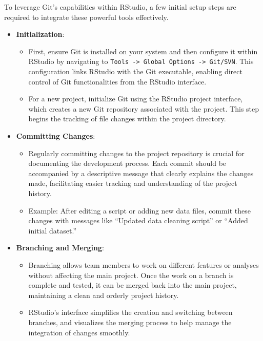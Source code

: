 \documentclass[
]{book}
\providecommand{\tightlist}{%
  \setlength{\itemsep}{0pt}\setlength{\parskip}{0pt}}
\begin{document}
To leverage Git's capabilities within RStudio, a few initial setup steps are required to integrate these powerful tools effectively.

\begin{itemize}
\tightlist
\item
  \textbf{Initialization}:

  \begin{itemize}
  \tightlist
  \item
    First, ensure Git is installed on your system and then configure it within RStudio by navigating to \texttt{Tools\ -\textgreater{}\ Global\ Options\ -\textgreater{}\ Git/SVN}. This configuration links RStudio with the Git executable, enabling direct control of Git functionalities from the RStudio interface.
  \item
    For a new project, initialize Git using the RStudio project interface, which creates a new Git repository associated with the project. This step begins the tracking of file changes within the project directory.
  \end{itemize}
\item
  \textbf{Committing Changes}:

  \begin{itemize}
  \tightlist
  \item
    Regularly committing changes to the project repository is crucial for documenting the development process. Each commit should be accompanied by a descriptive message that clearly explains the changes made, facilitating easier tracking and understanding of the project history.
  \item
    Example: After editing a script or adding new data files, commit these changes with messages like ``Updated data cleaning script'' or ``Added initial dataset.''
  \end{itemize}
\item
  \textbf{Branching and Merging}:

  \begin{itemize}
  \tightlist
  \item
    Branching allows team members to work on different features or analyses without affecting the main project. Once the work on a branch is complete and tested, it can be merged back into the main project, maintaining a clean and orderly project history.
  \item
    RStudio's interface simplifies the creation and switching between branches, and visualizes the merging process to help manage the integration of changes smoothly.
  \end{itemize}
\end{itemize}
\end{document}
